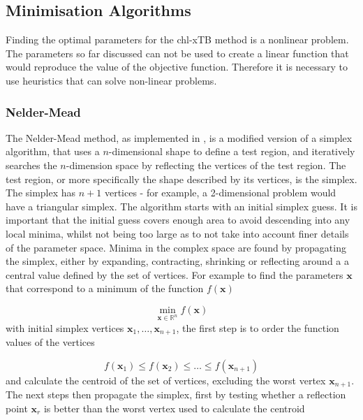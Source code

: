 \subsection{Minimisation Algorithms}
\label{subsec:algorithms}
Finding the optimal parameters for the chl-xTB method is a nonlinear problem. The
parameters so far discussed can not be used to create a linear function that would
reproduce the value of the objective function. Therefore it is necessary to use 
heuristics that can solve non-linear problems.

\subsubsection{Nelder-Mead}
\label{nelder_mead}
The Nelder-Mead method, as implemented in , is a modified version of a simplex
algorithm, that uses a $n$-dimensional shape to define a test region, and iteratively
searches the $n$-dimension space by reflecting the vertices of the test region. 
The test region, or more specifically the shape described by its vertices, is the
simplex. The simplex has $n+1$ vertices - for example, a 2-dimensional problem
would have a triangular simplex.
The algorithm starts with an initial simplex guess. It is important that the initial
guess covers enough area to avoid descending into any local minima, whilst not being
too large as to not take into account finer details of the parameter space. Minima
in the complex space are found by propagating the simplex, either by expanding,
contracting, shrinking or reflecting around a a central value defined by the set
of vertices. For example to find the parameters $\mathbf{x}$ that correspond to 
a minimum of the function $f\left(\mathbf{x}\right)$

\begin{equation}
\min_{\mathbf{x} \in \mathbb{R}^n} f\left( \mathbf{x} \right)
\end{equation}
%
with initial simplex vertices $\mathbf{x}_1, \dots, \mathbf{x}_{n+1}$, the first 
step is to order the function values of the vertices

\begin{equation}
f\left(\mathbf{x}_1\right) \leq f\left(\mathbf{x}_2\right) \leq \dots \leq f\left(\mathbf{x}_{n+1}\right)
\end{equation}
%
and calculate the centroid of the set of vertices, excluding the worst vertex 
$\mathbf{x}_{n+1}$. The next steps then propagate the simplex, first by testing 
whether a reflection point $\mathbf{x}_r$ is better than the worst vertex used to
calculate the centroid

